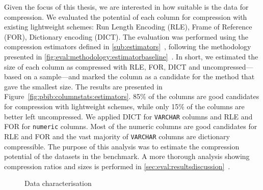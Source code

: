 Given the focus of this thesis, we are interested in how suitable is the data for compression. We evaluated the potential of each column for compression with existing lightweight schemes: Run Length Encoding (RLE), Frame of Reference (FOR), Dictionary encoding (DICT). The evaluation was performed using the compression estimators defined in \ref{sub:estimators}~, following the methodology presented in \ref{fig:eval:methodology:estimatorbaseline}~. In short, we estimated the size of each column as compressed with RLE, FOR, DICT and uncompressed---based on a sample---and marked the column as a candidate for the method that gave the smallest size. The results are presented in Figure~\ref{fig:pbib:columnstats:estimators}. 85\% of the columns are good candidates for compression with lightweight schemes, while only 15\% of the columns are better left uncompressed. We applied DICT for \verb|VARCHAR| columns and RLE and FOR for \verb|numeric| columns. Most of the numeric columns are good candidates for RLE and FOR and the vast majority of \verb|VARCHAR| columns are dictionary compressible. The purpose of this analysis was to estimate the compression potential of the datasets in the benchmark. A more thorough analysis showing compression ratios and sizes is performed in \ref{sec:eval:resultsdiscussion}~.

\begin{figure}[h]
\centering
{}
\caption{Data characterisation}
\label{fig:pbib:datastats}
\end{figure}

